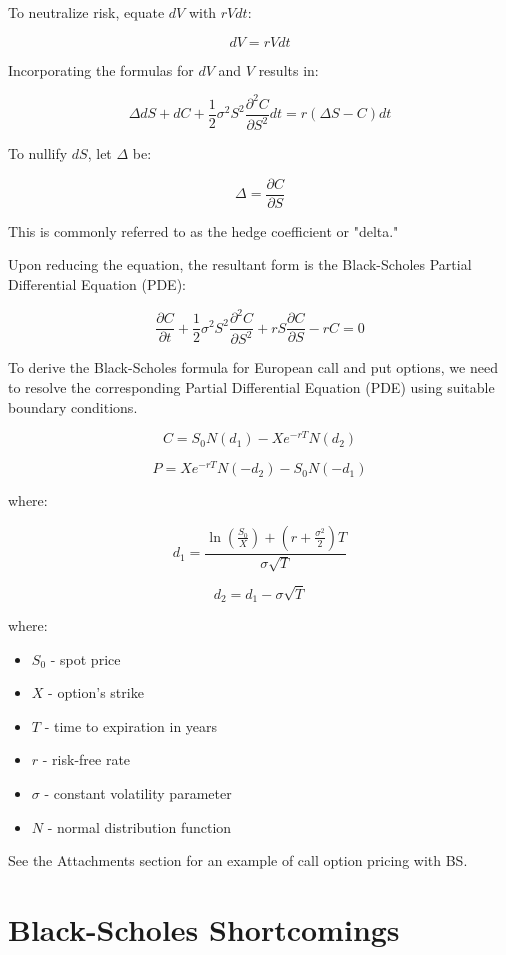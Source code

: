 \documentclass[a4paper,fleqn,12pt]{extarticle}
\begin{document}
	To neutralize risk, equate \( dV \) with \( rV dt \):

	\[
	dV = rV dt
	\]

	Incorporating the formulas for $dV$ and $V$ results in:

	\[
	\Delta dS + dC + \frac{1}{2} \sigma^2 S^2 \frac{\partial^2 C}{\partial S^2} dt = r(\Delta S - C) dt
	\]

	To nullify \( dS \), let \( \Delta \) be:

	\[
	\Delta = \frac{\partial C}{\partial S}
	\]

	This is commonly referred to as the hedge coefficient or "delta."

	Upon reducing the equation, the resultant form is the Black-Scholes Partial Differential Equation (PDE):

	\[
	\frac{\partial C}{\partial t} + \frac{1}{2} \sigma^2 S^2 \frac{\partial^2 C}{\partial S^2} + rS \frac{\partial C}{\partial S} - rC = 0
	\]

	To derive the Black-Scholes formula for European call and put options, we need to resolve the corresponding Partial Differential Equation (PDE) using suitable boundary conditions.

	\[
	C = S_0 N(d_1) - X e^{-rT} N(d_2)
	\]

	\[
	P = X e^{-rT} N(-d_2) - S_0 N(-d_1)
	\]

	where:

	\[
	d_1 = \frac{\ln(\frac{S_0}{X}) + (r + \frac{\sigma^2}{2}) T}{\sigma \sqrt{T}}
	\]

	\[
	d_2 = d_1 - \sigma \sqrt{T}
	\]

	where:
	\begin{itemize}
		\item \( S_0 \) - spot price
		\item \( X \) - option's strike
		\item \( T \) - time to expiration in years
		\item \( r \) - risk-free rate
		\item \( \sigma \) - constant volatility parameter
		\item \( N \) - normal distribution function
	\end{itemize}

	See the Attachments section for an example of call option pricing with BS.

	
	\newpage
	\section{Black-Scholes Shortcomings}
	
\end{document}
